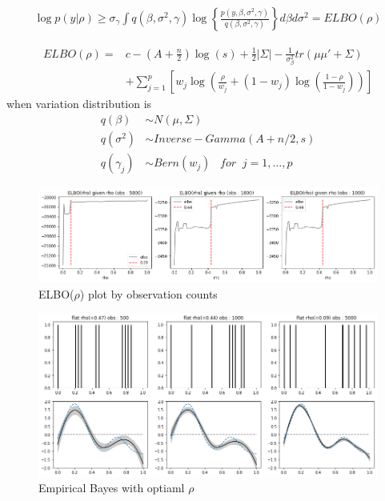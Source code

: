 \documentclass[11pt]{article}
\begin{document}
	\begin{align*}
	\log p(y|\rho) \ge \sigma_{\gamma} \int q(\beta,\sigma^2,\gamma) \log\left\{\frac{p(y,\beta,\sigma^2,\gamma)}{q(\beta,\sigma^2,\gamma)}\right\} d\beta d\sigma^2  = ELBO(\rho)
	\end{align*} 
	
	\begin{align*}
	ELBO(\rho) =& c -(A + \frac{n}{2}) \log(s) + \frac{1}{2}|\Sigma| - \frac{1}{\sigma_{\beta}^2} tr(\mu \mu' + \Sigma) \\
	& + \sum_{j=1}^{p} \left[ w_j \log\left(\frac{\rho}{w_j} + (1-w_j)\log\left( \frac{1-\rho}{1-w_j}\right)\right)\right]
	\end{align*}
	when variation distribution is
	\begin{align*}
	q(\beta) &\sim N(\mu,\Sigma)\\
	q(\sigma^2) &\sim Inverse-Gamma(A+n/2,s)\\
	q(\gamma_j) &\sim Bern(w_j) \;\;\; for \;\; j =1,\dots,p 
	\end{align*} 

	\begin{figure} [h]
		\centering
		\includegraphics[width=1\linewidth]{output_28_0}
		\caption{ELBO($\rho$) plot by observation counts}
		\label{fig:output280}
	\end{figure}

	\begin{figure} [h]
		\centering
		\includegraphics[width=1\linewidth]{output_40_0}
		\caption{Empirical Bayes with optiaml $\rho$}
		\label{fig:output400}
	\end{figure}
	\newpage
\end{document}
